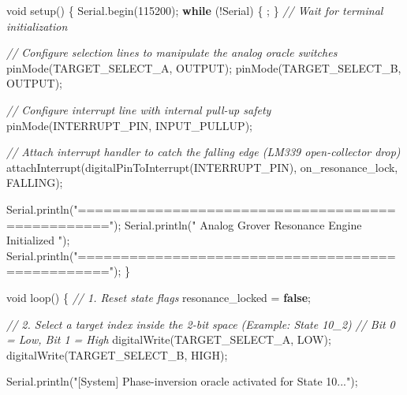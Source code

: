\documentclass[
]{article}
\newenvironment{Shaded}{}{}
\newcommand{\CommentTok}[1]{\textcolor[rgb]{0.38,0.63,0.69}{\textit{#1}}}
\newcommand{\ControlFlowTok}[1]{\textcolor[rgb]{0.00,0.44,0.13}{\textbf{#1}}}
\newcommand{\DataTypeTok}[1]{\textcolor[rgb]{0.56,0.13,0.00}{#1}}
\newcommand{\DecValTok}[1]{\textcolor[rgb]{0.25,0.63,0.44}{#1}}
\newcommand{\KeywordTok}[1]{\textcolor[rgb]{0.00,0.44,0.13}{\textbf{#1}}}
\newcommand{\NormalTok}[1]{#1}
\newcommand{\OperatorTok}[1]{\textcolor[rgb]{0.40,0.40,0.40}{#1}}
\newcommand{\StringTok}[1]{\textcolor[rgb]{0.25,0.44,0.63}{#1}}
\begin{document}
\begin{Shaded}
\begin{Highlighting}[]
\DataTypeTok{void}\NormalTok{ setup}\OperatorTok{()} \OperatorTok{\{}
\NormalTok{    Serial}\OperatorTok{.}\NormalTok{begin}\OperatorTok{(}\DecValTok{115200}\OperatorTok{);}
    \ControlFlowTok{while} \OperatorTok{(!}\NormalTok{Serial}\OperatorTok{)} \OperatorTok{\{} \OperatorTok{;} \OperatorTok{\}} \CommentTok{// Wait for terminal initialization}

    \CommentTok{// Configure selection lines to manipulate the analog oracle switches}
\NormalTok{    pinMode}\OperatorTok{(}\NormalTok{TARGET\_SELECT\_A}\OperatorTok{,}\NormalTok{ OUTPUT}\OperatorTok{);}
\NormalTok{    pinMode}\OperatorTok{(}\NormalTok{TARGET\_SELECT\_B}\OperatorTok{,}\NormalTok{ OUTPUT}\OperatorTok{);}
    
    \CommentTok{// Configure interrupt line with internal pull{-}up safety}
\NormalTok{    pinMode}\OperatorTok{(}\NormalTok{INTERRUPT\_PIN}\OperatorTok{,}\NormalTok{ INPUT\_PULLUP}\OperatorTok{);}
    
    \CommentTok{// Attach interrupt handler to catch the falling edge (LM339 open{-}collector drop)}
\NormalTok{    attachInterrupt}\OperatorTok{(}\NormalTok{digitalPinToInterrupt}\OperatorTok{(}\NormalTok{INTERRUPT\_PIN}\OperatorTok{),}\NormalTok{ on\_resonance\_lock}\OperatorTok{,}\NormalTok{ FALLING}\OperatorTok{);}

\NormalTok{    Serial}\OperatorTok{.}\NormalTok{println}\OperatorTok{(}\StringTok{"================================================="}\OperatorTok{);}
\NormalTok{    Serial}\OperatorTok{.}\NormalTok{println}\OperatorTok{(}\StringTok{"   Analog Grover Resonance Engine Initialized   "}\OperatorTok{);}
\NormalTok{    Serial}\OperatorTok{.}\NormalTok{println}\OperatorTok{(}\StringTok{"================================================="}\OperatorTok{);}
\OperatorTok{\}}

\DataTypeTok{void}\NormalTok{ loop}\OperatorTok{()} \OperatorTok{\{}
    \CommentTok{// 1. Reset state flags}
\NormalTok{    resonance\_locked }\OperatorTok{=} \KeywordTok{false}\OperatorTok{;}
    
    \CommentTok{// 2. Select a target index inside the 2{-}bit space (Example: State 10\_2)}
    \CommentTok{// Bit 0 = Low, Bit 1 = High}
\NormalTok{    digitalWrite}\OperatorTok{(}\NormalTok{TARGET\_SELECT\_A}\OperatorTok{,}\NormalTok{ LOW}\OperatorTok{);}
\NormalTok{    digitalWrite}\OperatorTok{(}\NormalTok{TARGET\_SELECT\_B}\OperatorTok{,}\NormalTok{ HIGH}\OperatorTok{);}
    
\NormalTok{    Serial}\OperatorTok{.}\NormalTok{println}\OperatorTok{(}\StringTok{"[System] Phase{-}inversion oracle activated for State 10..."}\OperatorTok{);}


\end{Highlighting}
\end{Shaded}
\end{document}
